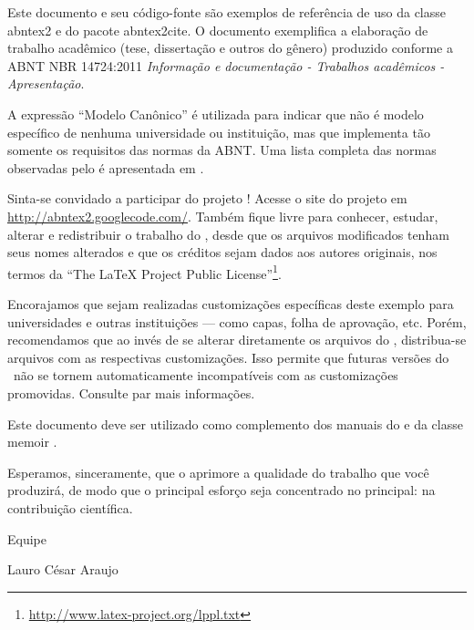 



Este documento e seu código-fonte são exemplos de referência de uso da classe
\textsf{abntex2} e do pacote \textsf{abntex2cite}. O documento
exemplifica a elaboração de trabalho acadêmico (tese, dissertação e outros do
gênero) produzido conforme a ABNT NBR 14724:2011 \emph{Informação e documentação
    - Trabalhos acadêmicos - Apresentação}.

A expressão ``Modelo Canônico'' é utilizada para indicar que \abnTeX{} não é
modelo específico de nenhuma universidade ou instituição, mas que implementa tão
somente os requisitos das normas da ABNT. Uma lista completa das normas
observadas pelo \abnTeX{} é apresentada em \textcite{abntex2classe}.

Sinta-se convidado a participar do projeto \abnTeX{}! Acesse o site do projeto em
\url{http://abntex2.googlecode.com/}. Também fique livre para conhecer,
estudar, alterar e redistribuir o trabalho do \abnTeX{}, desde que os arquivos
modificados tenham seus nomes alterados e que os créditos sejam dados aos
autores originais, nos termos da ``The \LaTeX{} Project Public
License''\footnote{\url{http://www.latex-project.org/lppl.txt}}.

Encorajamos que sejam realizadas customizações específicas deste exemplo para
universidades e outras instituições --- como capas, folha de aprovação, etc.
Porém, recomendamos que ao invés de se alterar diretamente os arquivos do
\abnTeX{}, distribua-se arquivos com as respectivas customizações.
Isso permite que futuras versões do \abnTeX{}~não se tornem automaticamente
incompatíveis com as customizações promovidas. Consulte
\textcite{abntex2-wiki-como-customizar} par mais informações.

Este documento deve ser utilizado como complemento dos manuais do \abnTeX{}
\cite{abntex2classe,abntex2cite,abntex2cite-alf} e da classe \textsf{memoir}
\cite{memoir}.

Esperamos, sinceramente, que o \abnTeX{} aprimore a qualidade do trabalho que
você produzirá, de modo que o principal esforço seja concentrado no principal:
na contribuição científica.

Equipe \abnTeX{}

Lauro César Araujo



